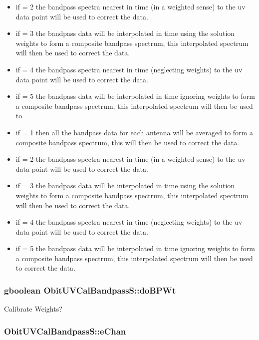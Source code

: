 \begin{itemize}
\item if = 2 the bandpass spectra nearest in time (in a weighted sense) to the uv data point will be used to correct the data. \item if = 3 the bandpass data will be interpolated in time using the solution weights to form a composite bandpass spectrum, this interpolated spectrum will then be used to correct the data. \item if = 4 the bandpass spectra nearest in time (neglecting weights) to the uv data point will be used to correct the data. \item if = 5 the bandpass data will be interpolated in time ignoring weights to form a composite bandpass spectrum, this interpolated spectrum will then be used to \item if = 1 then all the bandpass data for each antenna will be averaged to form a composite bandpass spectrum, this will then be used to correct the data. \item if = 2 the bandpass spectra nearest in time (in a weighted sense) to the uv data point will be used to correct the data. \item if = 3 the bandpass data will be interpolated in time using the solution weights to form a composite bandpass spectrum, this interpolated spectrum will then be used to correct the data. \item if = 4 the bandpass spectra nearest in time (neglecting weights) to the uv data point will be used to correct the data. \item if = 5 the bandpass data will be interpolated in time ignoring weights to form a composite bandpass spectrum, this interpolated spectrum will then be used to correct the data. \end{itemize}
\subsubsection{\setlength{\rightskip}{0pt plus 5cm}gboolean {\bf Obit\-UVCal\-Bandpass\-S::do\-BPWt}}\label{structObitUVCalBandpassS_o23}


Calibrate Weights? 

\subsubsection{ {\bf Obit\-UVCal\-Bandpass\-S::e\-Chan}}\label{structObitUVCalBandpassS_o13}


